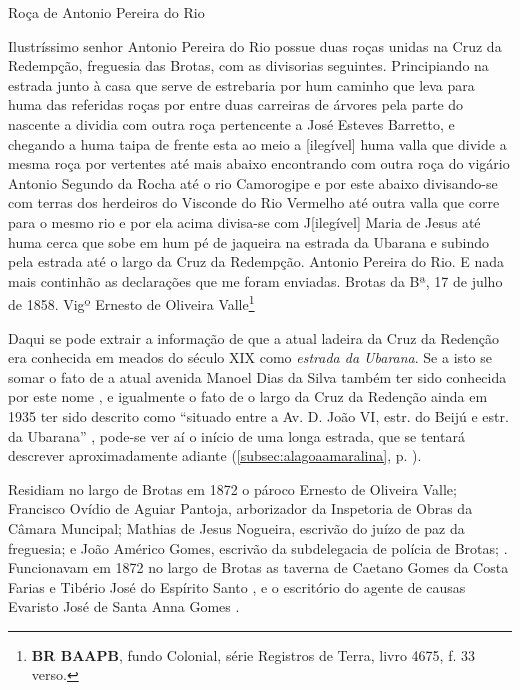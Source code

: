 \begin{citacao}
Roça de Antonio Pereira do Rio

Ilustríssimo senhor Antonio Pereira do Rio possue duas roças unidas na Cruz da Redempção, freguesia das Brotas, com as divisorias seguintes. Principiando na estrada junto à casa que serve de estrebaria por hum caminho que leva para huma das referidas roças por entre duas carreiras de árvores pela parte do nascente a dividia com outra roça pertencente a José Esteves Barretto, e chegando a huma taipa de frente esta ao meio a [ilegível] huma valla que divide a mesma roça por vertentes até mais abaixo encontrando com outra roça do vigário Antonio Segundo da Rocha até o rio Camorogipe e por este abaixo divisando-se com terras dos herdeiros do Visconde do Rio Vermelho até outra valla que corre para o mesmo rio e por ela acima divisa-se com J[ilegível] Maria de Jesus até huma cerca que sobe em hum pé de jaqueira na estrada da Ubarana e subindo pela estrada até o largo da Cruz da Redempção. Antonio Pereira do Rio. E nada mais continhão as declarações que me foram enviadas. Brotas da Bª, 17 de julho de 1858. Vigº Ernesto de Oliveira Valle\footnote{\textbf{BR BAAPB}, fundo Colonial, série Registros de Terra, livro 4675, f. 33 verso.}
\end{citacao}

Daqui se pode extrair a informação de que a atual ladeira da Cruz da Redenção era conhecida em meados do século XIX como \textit{estrada da Ubarana}. Se a isto se somar o fato de a atual avenida Manoel Dias da Silva também ter sido conhecida por este nome \cite[p.~85]{souza_guia_1935}, e igualmente o fato de o largo da Cruz da Redenção ainda em 1935 ter sido descrito como ``situado entre a Av. D. João VI, estr. do Beijú e estr. da Ubarana'' \cite[p~41]{souza_guia_1935}, pode-se ver aí o início de uma longa estrada, que se tentará descrever aproximadamente adiante (\autoref{subsec:alagoaamaralina}, p. \pageref{subsec:alagoaamaralina}).

Residiam no largo de Brotas em 1872 o pároco Ernesto de Oliveira Valle; Francisco Ovídio de Aguiar Pantoja, arborizador da Inspetoria de Obras da Câmara Muncipal; Mathias de Jesus Nogueira, escrivão do juízo de paz da freguesia; e João Américo Gomes, escrivão da subdelegacia de polícia de Brotas; \cite[segunda~parte, pp.~69, 87, 91, 132]{pimenta_almanak_1872}. Funcionavam em 1872 no largo de Brotas as taverna de Caetano Gomes da Costa Farias e Tibério José do Espírito Santo \cite[terceira~parte, pp.~40, 49]{pimenta_almanak_1872}, e o escritório do agente de causas Evaristo José de Santa Anna Gomes \cite[quarta~parte, pp.~6, 8]{pimenta_almanak_1872}.

